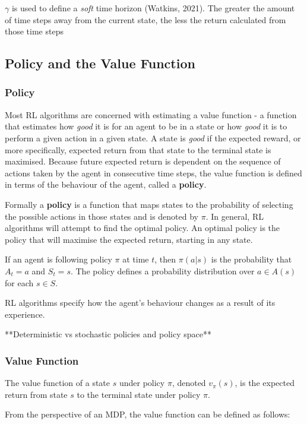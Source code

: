 \documentclass{article}
\begin{document}
$\gamma$ is used to define a \textit{soft} time horizon (Watkins, 2021). The greater the amount of time steps away from the current state, the less the return calculated from those time steps


\subsection{Policy and the Value Function}

\subsubsection{Policy}

Most RL algorithms are concerned with estimating a value function - a function that estimates how \textit{good} it is for an agent to be in a state or how \textit{good} it is to perform a given action in a given state. A state is \textit{good} if the expected reward, or more specifically, expected return from that state to the terminal state is maximised\cite{Sutton1998}. Because future expected return is dependent on the sequence of actions taken by the agent in consecutive time steps, the value function is defined in terms of the behaviour of the agent, called a \textbf{policy}.

Formally a \textbf{policy} is a function that maps states to the probability of selecting the possible actions in those states and is denoted by $\pi$. In general, RL algorithms will attempt to find the optimal policy. An optimal policy is the policy that will maximise the expected return, starting in any state.

If an agent is following policy $\pi$ at time $t$, then $\pi(a|s)$ is the probability that $A_t = a$ and $S_t = s$. The policy defines a probability distribution over $a \in A(s)$ for each $s \in S$. 

RL algorithms specify how the agent's behaviour changes as a result of its experience.

**Deterministic vs stochastic policies and policy space**

\subsubsection{Value Function}

The value function of a state $s$ under policy $\pi$, denoted $v_\pi(s)$, is the expected return from state $s$ to the terminal state under policy $\pi$.

From the perspective of an MDP, the value function can be defined as follows\cite{RLNotes}\cite{Sutton1998}: 
\end{document}
